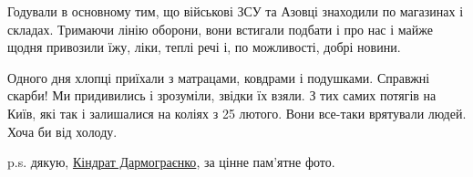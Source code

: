 Годували в основному тим, що військові ЗСУ та Азовці знаходили по магазинах і складах. Тримаючи лінію оборони, вони встигали подбати і про нас і майже щодня привозили їжу, ліки, теплі речі і, по можливості, добрі новини.

Одного дня хлопці приїхали з матрацами, ковдрами і подушками. Справжні скарби!
Ми придивились і зрозуміли, звідки їх взяли. З тих самих потягів на Київ, які
так і залишалися на коліях з 25 лютого. Вони все-таки врятували людей. Хоча би
від холоду.

p.s. дякую, \href{https://www.facebook.com/profile.php?id=100013159908154}{Кіндрат Дармограєнко}, за цінне пам'ятне фото.

